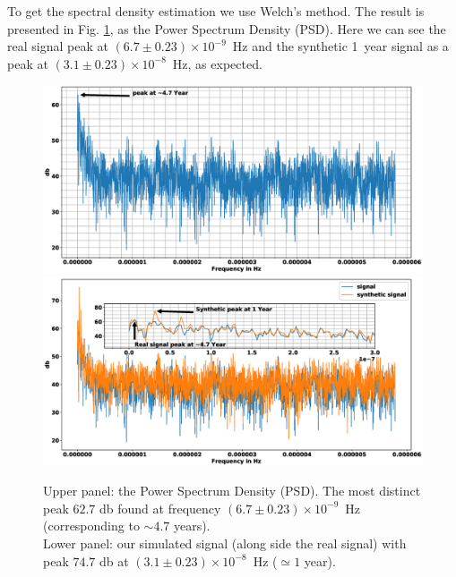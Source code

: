 \documentclass[twocolumn]{aastex62}
\begin{document}
To get the spectral density estimation we use Welch's method.
The result is presented in Fig. \ref{fig:welch}, as the Power Spectrum Density (PSD).
Here we can see the real signal peak at $(6.7 \pm 0.23) \times10^{-9}$~Hz and the synthetic 1~year signal as a peak at $(3.1 \pm 0.23) \times 10^{-8}$~Hz, as expected.
%
\begin{figure}
\includegraphics[width=1\textwidth]{welch.eps}
\includegraphics[width=1\textwidth]{welch_synth.eps}
\caption{Upper panel: the Power Spectrum Density (PSD). The most distinct peak $62.7$ db found at frequency $(6.7 \pm 0.23) \times10^{-9}$~Hz (corresponding to $\sim 4.7$ years). \\ 
Lower panel: our simulated signal (along side the real signal) with peak $74.7$ db at $(3.1 \pm 0.23) \times 10^{-8}$~Hz ($\simeq 1$ year).
}
\label{fig:welch}
\end{figure}
\end{document}
